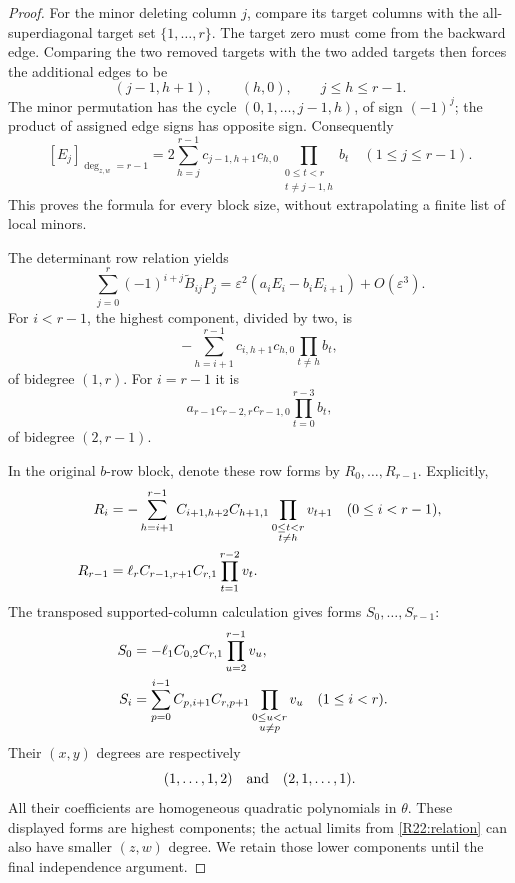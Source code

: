 \documentclass[11pt,a4paper]{article}
\theoremstyle{definition}\newtheorem{definition}{Definition}
\begin{document}
\begin{proof}
For the minor deleting column $j$, compare its target columns with
the all-superdiagonal target set $\{1,\ldots,r\}$.
The target zero must come from the backward edge. Comparing the
two removed targets with the two added targets then forces the
additional edges to be
\[
 (j-1,h+1),\qquad(h,0),\qquad j\leq h\leq r-1.
\]
The minor permutation has the cycle
$(0,1,\ldots,j-1,h)$, of sign $(-1)^j$; the product of assigned
edge signs has opposite sign. Consequently
\begin{equation}\label{R22:Etop}
 [E_j]_{\deg_{z,w}=r-1}
 =2\sum_{h=j}^{r-1}c_{j-1,h+1}c_{h,0}
           \prod_{\substack{0\leq t<r\\t\ne j-1,h}}b_t
 \quad(1\leq j\leq r-1).
\end{equation}
This proves the formula for every block size, without extrapolating
a finite list of local minors.

The determinant row relation yields
\begin{equation}\label{R22:relation}
 \sum_{j=0}^{r}(-1)^{i+j}\widetilde B_{ij}P_j
 =\varepsilon^2(a_iE_i-b_iE_{i+1})+O(\varepsilon^3).
\end{equation}
For $i<r-1$, the highest component, divided by two, is
\[
 -\sum_{h=i+1}^{r-1}c_{i,h+1}c_{h,0}
                          \prod_{t\ne h}b_t,
\]
of bidegree $(1,r)$. For $i=r-1$ it is
\[
 a_{r-1}c_{r-2,r}c_{r-1,0}\prod_{t=0}^{r-3}b_t,
\]
of bidegree $(2,r-1)$.

In the original $b$-row block, denote these row forms by
$R_0,\ldots,R_{r-1}$. Explicitly,
\begin{align}
 R_i&=-\sum_{h=i+1}^{r-1}C_{i+1,h+2}C_{h+1,1}
                 \prod_{\substack{0\leq t<r\\t\ne h}}v_{t+1}
                     &&(0\leq i<r-1),\label{R22:Rforms}\\
 R_{r-1}&=\ell_r C_{r-1,r+1}C_{r,1}
                                      \prod_{t=1}^{r-2}v_t.\notag
\end{align}
The transposed supported-column calculation gives forms
$S_0,\ldots,S_{r-1}$:
\begin{align}
 S_0&=-\ell_1 C_{0,2}C_{r,1}\prod_{u=2}^{r-1}v_u,
                                                     \label{R22:Sforms}\\
 S_i&=\sum_{p=0}^{i-1}C_{p,i+1}C_{r,p+1}
                    \prod_{\substack{0\leq u<r\\u\ne p}}v_u
                    &&(1\leq i<r).\notag
\end{align}
Their $(x,y)$ degrees are respectively
\begin{equation}\label{R22:grades}
 (1,\ldots,1,2)\quad\hbox{and}\quad(2,1,\ldots,1).
\end{equation}
All their coefficients are homogeneous quadratic polynomials in
$\theta$. These displayed forms are highest components; the actual
limits from \eqref{R22:relation} can also have smaller $(z,w)$ degree.
We retain those lower components until the final independence argument.


\end{proof}
\end{document}

